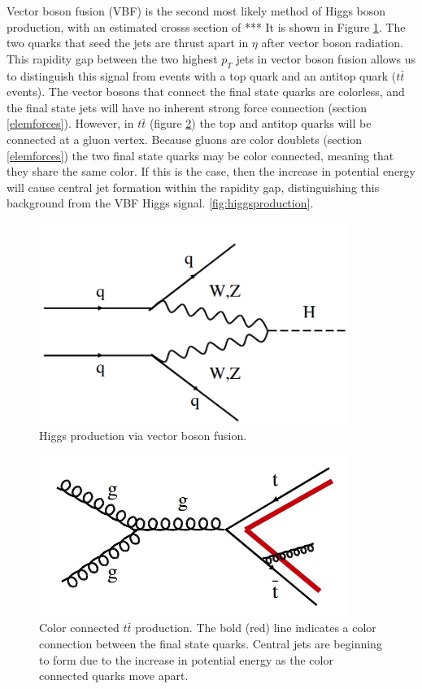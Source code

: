 \documentclass[oneside, letterpaper, oldfontcommands]{memoir}
\begin{document}
\qquad Vector boson fusion (VBF) is the second most likely method of Higgs boson production, with an estimated crosss section of *** It is shown in Figure \ref{fig:vbfHiggs}. The two quarks that seed the jets are thrust apart in $\eta$ after vector boson radiation. This rapidity gap between the two highest $p_{T}$ jets in vector boson fusion allows us to distinguish this signal from events with a top quark and an antitop quark ($t\bar{t}$ events). The vector bosons that connect the final state quarks are colorless, and the final state jets will have no inherent strong force connection (section \ref{elemforces}). However, in $t\bar{t}$ (figure \ref{fig:ttbarcolor}) the top and antitop quarks will be connected at a gluon vertex. Because gluons are color doublets (section \ref{elemforces}) the two final state quarks may be color connected, meaning that they share the same color. If this is the case, then the increase in potential energy will cause central jet formation within the rapidity gap, distinguishing this background from the VBF Higgs signal. \ref{fig:higgsproduction}\cite{Dittmaier:2011ti}.

\begin{figure}[here]
\includegraphics[width=0.9\textwidth]{vbfHiggs.png}
\caption{Higgs production via vector boson fusion.}
\label{fig:vbfHiggs}
\end{figure}

\begin{figure}[here]
\includegraphics[width=0.9\textwidth]{ttbarcolor.jpg}
\caption{Color connected $t\bar{t}$ production. The bold (red) line indicates a color connection between the final state quarks. Central jets are beginning to form due to the increase in potential energy as the color connected quarks move apart.}
\label{fig:ttbarcolor}
\end{figure}
\end{document}
